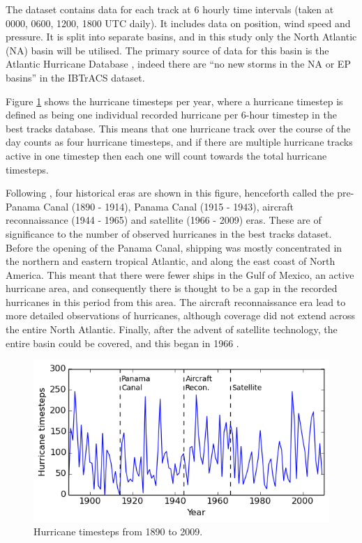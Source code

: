 \documentclass[pdftex,12pt,a4paper]{report}
\begin{document}
The dataset contains data for each track at 6 hourly time intervals (taken at 0000, 0600, 1200, 1800
UTC daily). It includes data on position, wind speed and pressure. It is split into separate basins,
and in this study only the North Atlantic (NA) basin will be utilised. The primary source of data
for this basin is the Atlantic Hurricane Database \parencite[HURDAT;][]{jarvinen1984tropical}, indeed
there are ``no new storms in the NA or EP basins'' in the IBTrACS dataset.

Figure \ref{fig:hurr_per_year} shows the hurricane timesteps per year, where a hurricane timestep is
defined as being one individual recorded hurricane per 6-hour timestep in the best tracks database.
This means that one hurricane track over the course of the day counts as four hurricane timesteps,
and if there are multiple hurricane tracks active in one timestep then each one will count towards
the total hurricane timesteps. 

Following \textcite{vecchi2008estimates}, four historical eras are shown in this figure, henceforth
called the pre-Panama Canal (1890 - 1914), Panama Canal (1915 - 1943), aircraft reconnaissance (1944
- 1965) and satellite (1966 - 2009) eras.  These are of significance to the number of observed
hurricanes in the best tracks dataset. Before the opening of the Panama Canal, shipping was
mostly concentrated in the northern and eastern tropical Atlantic, and along the east coast of North
America. This meant that there were fewer ships in the Gulf of Mexico, an active hurricane area, and
consequently there is thought to be a gap in the recorded hurricanes in this period from this area.
The aircraft reconnaissance era lead to more detailed observations of hurricanes, although coverage
did not extend across the entire North Atlantic. Finally, after the advent of satellite technology,
the entire basin could be covered, and this began in 1966 \parencite{landsea2007counting}.


\begin{figure}[hb!]
    \centering
    \includegraphics[width=\textwidth]{figures/hurr_per_year}
    \caption{Hurricane timesteps from 1890 to 2009.}
    \label{fig:hurr_per_year}
\end{figure}
\end{document}
